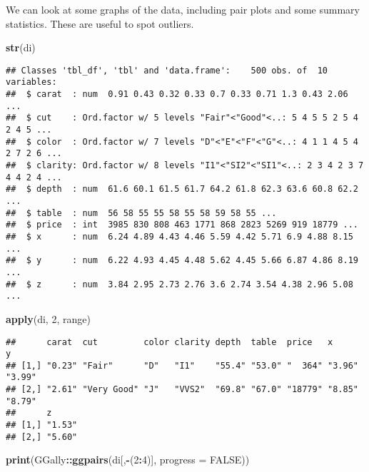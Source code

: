 \documentclass[]{book}
\newenvironment{Shaded}{\begin{snugshade}}{\end{snugshade}}
\newcommand{\DataTypeTok}[1]{\textcolor[rgb]{0.13,0.29,0.53}{#1}}
\newcommand{\DecValTok}[1]{\textcolor[rgb]{0.00,0.00,0.81}{#1}}
\newcommand{\KeywordTok}[1]{\textcolor[rgb]{0.13,0.29,0.53}{\textbf{#1}}}
\newcommand{\NormalTok}[1]{#1}
\newcommand{\OperatorTok}[1]{\textcolor[rgb]{0.81,0.36,0.00}{\textbf{#1}}}
\newcommand{\OtherTok}[1]{\textcolor[rgb]{0.56,0.35,0.01}{#1}}
\theoremstyle{definition}
\theoremstyle{definition}
\theoremstyle{definition}
\theoremstyle{remark}
\begin{document}
We can look at some graphs of the data, including pair plots and some
summary statistics. These are useful to spot outliers.

\begin{Shaded}
\begin{Highlighting}[]
\KeywordTok{str}\NormalTok{(di)}
\end{Highlighting}
\end{Shaded}

\begin{verbatim}
## Classes 'tbl_df', 'tbl' and 'data.frame':    500 obs. of  10 variables:
##  $ carat  : num  0.91 0.43 0.32 0.33 0.7 0.33 0.71 1.3 0.43 2.06 ...
##  $ cut    : Ord.factor w/ 5 levels "Fair"<"Good"<..: 5 4 5 5 2 5 4 2 4 5 ...
##  $ color  : Ord.factor w/ 7 levels "D"<"E"<"F"<"G"<..: 4 1 1 4 5 4 2 7 2 6 ...
##  $ clarity: Ord.factor w/ 8 levels "I1"<"SI2"<"SI1"<..: 2 3 4 2 3 7 4 4 2 4 ...
##  $ depth  : num  61.6 60.1 61.5 61.7 64.2 61.8 62.3 63.6 60.8 62.2 ...
##  $ table  : num  56 58 55 55 58 55 58 59 58 55 ...
##  $ price  : int  3985 830 808 463 1771 868 2823 5269 919 18779 ...
##  $ x      : num  6.24 4.89 4.43 4.46 5.59 4.42 5.71 6.9 4.88 8.15 ...
##  $ y      : num  6.22 4.93 4.45 4.48 5.62 4.45 5.66 6.87 4.86 8.19 ...
##  $ z      : num  3.84 2.95 2.73 2.76 3.6 2.74 3.54 4.38 2.96 5.08 ...
\end{verbatim}

\begin{Shaded}
\begin{Highlighting}[]
\KeywordTok{apply}\NormalTok{(di, }\DecValTok{2}\NormalTok{, range)}
\end{Highlighting}
\end{Shaded}

\begin{verbatim}
##      carat  cut         color clarity depth  table  price   x      y     
## [1,] "0.23" "Fair"      "D"   "I1"    "55.4" "53.0" "  364" "3.96" "3.99"
## [2,] "2.61" "Very Good" "J"   "VVS2"  "69.8" "67.0" "18779" "8.85" "8.79"
##      z     
## [1,] "1.53"
## [2,] "5.60"
\end{verbatim}

\begin{Shaded}
\begin{Highlighting}[]
\KeywordTok{print}\NormalTok{(GGally}\OperatorTok{::}\KeywordTok{ggpairs}\NormalTok{(di[,}\OperatorTok{-}\NormalTok{(}\DecValTok{2}\OperatorTok{:}\DecValTok{4}\NormalTok{)], }\DataTypeTok{progress =} \OtherTok{FALSE}\NormalTok{))}
\end{Highlighting}
\end{Shaded}
\end{document}

